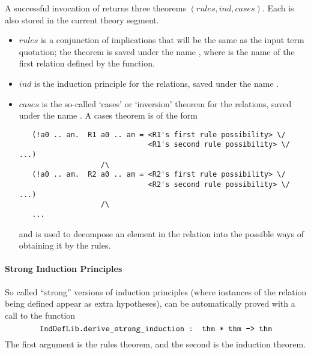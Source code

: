 A successful invocation of  returns three theorems
$(\mathit{rules},\mathit{ind},\mathit{cases})$. Each is also stored in
the current theory segment.
\begin{itemize}
\item $\mathit{rules}$ is a conjunction of implications
that will be the same as the input term quotation; the theorem is
saved under the name , where  is the name of the
first relation defined by the function.
\item $\mathit{ind}$ is the induction principle for the relations,
saved under the name .
\item $\mathit{cases}$ is the so-called `cases' or `inversion' theorem
  for the relations, saved under the name . A cases
  theorem is of the form
%
\begin{hol}
\begin{verbatim}
   (!a0 .. an.  R1 a0 .. an = <R1's first rule possibility> \/
                              <R1's second rule possibility> \/ ...)
                   /\
   (!a0 .. am.  R2 a0 .. am = <R2's first rule possibility> \/
                              <R2's second rule possibility> \/ ...)
                   /\
   ...
\end{verbatim}
\end{hol}
%
and is used to decompose an element in the relation into the
possible ways of obtaining it by the rules.
\end{itemize}

\paragraph{Strong Induction Principles}
So called ``strong'' versions of induction principles (where instances
of the relation being defined appear as extra hypotheses), can be
automatically proved with a call to the function
\[
\ml{IndDefLib.derive\_strong\_induction : thm * thm -> thm}
\]
The first argument is the rules theorem, and the second is the
induction theorem.

